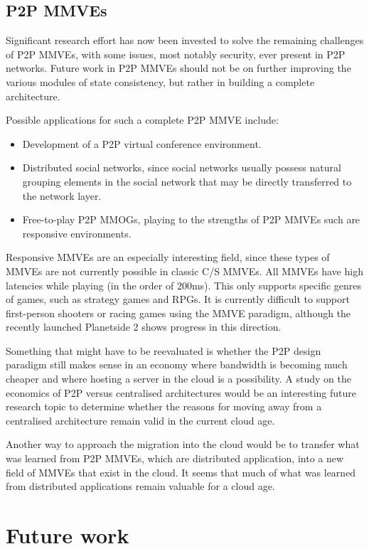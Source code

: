 \subsection{P2P MMVEs}
Significant research effort has now been invested to solve the remaining challenges of P2P MMVEs, with some issues, most notably security, ever present in P2P networks. Future work in P2P MMVEs should not be on further improving the various modules of state consistency, but rather in building a complete architecture.

Possible applications for such a complete P2P MMVE include:
%
\begin{itemize}
\item Development of a P2P virtual conference environment.
\item Distributed social networks, since social networks usually possess natural grouping elements in the social network that may be directly transferred to the network layer.
\item Free-to-play P2P MMOGs, playing to the strengths of P2P MMVEs such are responsive environments.
\end{itemize}

Responsive MMVEs are an especially interesting field, since these types of MMVEs are not currently possible in classic C/S MMVEs. All MMVEs have high latencies while playing (in the order of 200ms). This only supports specific genres of games, such as strategy games and RPGs. It is currently difficult to support first-person shooters or racing games using the MMVE paradigm, although the recently launched Planetside 2 shows progress in this direction.

Something that might have to be reevaluated is whether the P2P design paradigm still makes sense in an economy where bandwidth is becoming much cheaper and where hosting a server in the cloud is a possibility. A study on the economics of P2P versus centralised architectures would be an interesting future research topic to determine whether the reasons for moving away from a centralised architecture remain valid in the current cloud age.

Another way to approach the migration into the cloud would be to transfer what was learned from P2P MMVEs, which are distributed application, into a new field of MMVEs that exist in the cloud. It seems that much of what was learned from distributed applications remain valuable for a cloud age.

\section{Future work}

